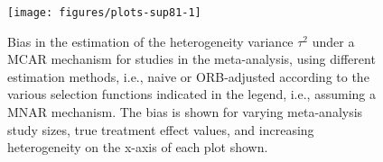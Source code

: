 \documentclass{article}\usepackage[]{graphicx}\usepackage[]{xcolor}
\begin{document}
\begin{figure}[!hbt]
\centering
\caption{Bias in the estimation of the heterogeneity variance $\tau^2$ under a MCAR mechanism for studies in the meta-analysis, using different estimation methods, i.e., naive or ORB-adjusted according to the various selection functions indicated in the legend, i.e., assuming a MNAR mechanism. The bias is shown for varying meta-analysis study sizes, true treatment effect values, and increasing heterogeneity on the x-axis of each plot shown.\\[0.5em]}


{\centering \texttt{[image: figures/plots-sup81-1]} 

}



\label{biastau2new}
\end{figure}
\end{document}
